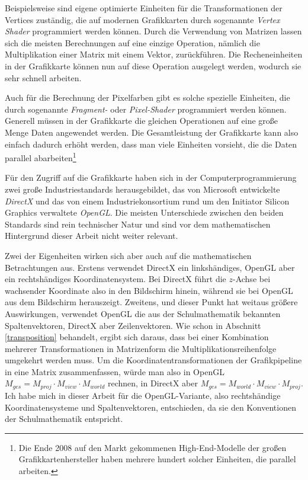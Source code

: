 Beispielsweise sind eigene optimierte Einheiten für die Transformationen der Vertices zuständig, die auf modernen Grafikkarten durch sogenannte \emph{Vertex Shader} programmiert werden können. Durch die Verwendung von Matrizen lassen sich die meisten Berechnungen auf eine einzige Operation, nämlich die Multiplikation einer Matrix mit einem Vektor, zurückführen. Die Recheneinheiten in der Grafikkarte können nun auf diese Operation ausgelegt werden, wodurch sie sehr schnell arbeiten.

Auch für die Berechnung der Pixelfarben gibt es solche spezielle Einheiten, die durch sogenannte \emph{Fragment-} oder \emph{Pixel-Shader} programmiert werden können. Generell müssen in der Grafikkarte die gleichen Operationen auf eine große Menge Daten angewendet werden. Die Gesamtleistung der Grafikkarte kann also einfach dadurch erhöht werden, dass man viele Einheiten vorsieht, die die Daten parallel abarbeiten\footnote{Die Ende 2008 auf den Markt gekommenen High-End-Modelle der großen Grafikkartenhersteller haben mehrere hundert solcher Einheiten, die parallel arbeiten. }

\label{direct3dopengl}
Für den Zugriff auf die Grafikkarte haben sich in der Computerprogrammierung zwei große Industriestandards herausgebildet, das von Microsoft entwickelte \emph{DirectX} und das von einem Industriekonsortium rund um den Initiator Silicon Graphics verwaltete \emph{OpenGL}. Die meisten Unterschiede zwischen den beiden Standards sind rein technischer Natur und sind vor dem mathematischen Hintergrund dieser Arbeit nicht weiter relevant.

Zwei der Eigenheiten wirken sich aber auch auf die mathematischen Betrachtungen aus. Erstens verwendet DirectX ein linkshändiges, OpenGL aber ein rechtshändiges Koordinatensystem. Bei DirectX führt die $z$-Achse bei wachsender Koordinate also in den Bildschirm hinein, während sie bei OpenGL aus dem Bildschirm herauszeigt. Zweitens, und dieser Punkt hat weitaus größere Auswirkungen, verwendet OpenGL die aus der Schulmathematik bekannten Spaltenvektoren, DirectX aber Zeilenvektoren. Wie schon in Abschnitt \ref{transposition} behandelt, ergibt sich daraus, dass bei einer Kombination mehrerer Transformationen in Matrizenform die Multiplikationsreihenfolge umgekehrt werden muss. Um die Koordinatentransformationen der Grafikpipeline in eine Matrix zusammenfassen, würde man also in OpenGL $M_{ges} = M_{proj} \cdot M_{view} \cdot M_{world}$ rechnen, in DirectX aber $M_{ges} = M_{world} \cdot M_{view} \cdot M_{proj}$. Ich habe mich in dieser Arbeit für die OpenGL-Variante, also rechtshändige Koordinatensysteme und Spaltenvektoren, entschieden, da sie den Konventionen der Schulmathematik entspricht.

